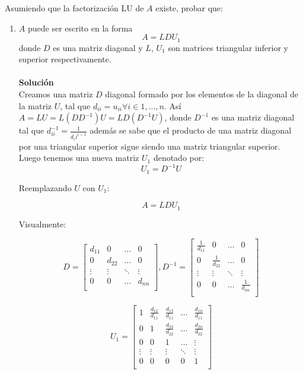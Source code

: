 Asumiendo que la factorización LU de $A$ existe, probar que:
\begin{enumerate}
    \item $A$ puede ser escrito en la forma\\
    $$
     A = LDU_1
    $$
    donde $D$ es una matriz diagonal y $L$, $U_1$ son matrices triangular inferior y superior respectivamente.\\\\
    \textbf{Solución}\\
    Creamos una matriz $D$ diagonal formado por los elementos de la diagonal de la matriz $U$, tal que $d_{ii} = u_{ii} \forall i \in 1, \ldots, n$. Así $A = LU = L(DD^{-1})U = LD(D^{-1}U)$, donde $D^{-1}$ es una matriz diagonal tal que $d_{ii}^{-1} = \frac{1}{d_ii^{i-1}}$ además se sabe que el producto de una matriz diagonal por una triangular superior sigue siendo una matriz triangular superior. Luego tenemos una nueva matriz $U_1$ denotado por:
    $$
    U_1 = D^{-1}U
    $$
    
    Reemplazando $U$ con $U_1$:
    
    $$
    A = LDU_1
    $$
    
    Visualmente:
    
    \[
        D = \begin{bmatrix}
            d_{11} & 0 & \ldots & 0 \\
            0 & d_{22} & \ldots & 0 \\
            \vdots & \vdots & \ddots & \vdots\\
            0 & 0 & \ldots & d_{nn}\\
        \end{bmatrix}
        ,
        D^{-1} = \begin{bmatrix}
            \frac{1}{d_{11}} & 0 & \ldots & 0 \\
            0 & \frac{1}{d_{22}} & \ldots & 0 \\
            \vdots & \vdots & \ddots & \vdots\\
            0 & 0 & \ldots & \frac{1}{d_{nn}}\\
        \end{bmatrix}
    \]
    
    \[
        U_1 = \begin{bmatrix}
            1 & \frac{d_{12}}{d_{11}} & \frac{d_{13}}{d_{11}} & \ldots & \frac{d_{1n}}{d_{11}}\\
            0 & 1 & \frac{d_{23}}{d_{22}} & \ldots & \frac{d_{2n}}{d_{22}}\\
            0 & 0 & 1 & \ldots & \vdots\\
            \vdots & \vdots & \vdots & \ddots & \vdots\\
            0 & 0 & 0 & 0& 1\\
        \end{bmatrix}
    \]
    

\end{enumerate}
